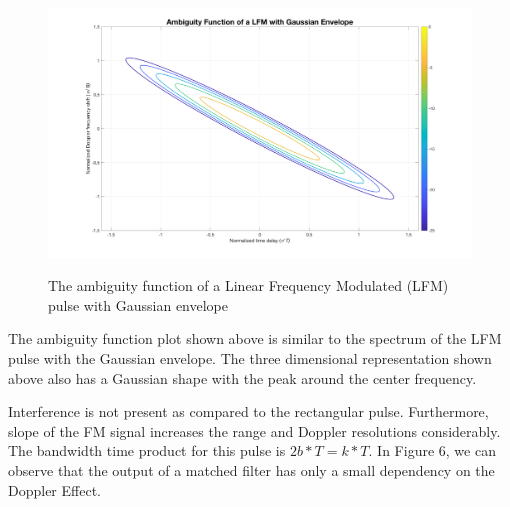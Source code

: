 \begin{figure}[H]
\centering
{\includegraphics[scale=0.18]{usp8_6.png}}
\caption{ The ambiguity function of a Linear Frequency Modulated (LFM) pulse with Gaussian envelope }
\end{figure}

\noindent The ambiguity function plot shown above is similar to the spectrum of the LFM pulse with the Gaussian envelope. The three dimensional representation shown above also has a Gaussian shape with the peak around the center frequency.

\noindent Interference is not present as compared to the rectangular pulse. Furthermore, slope of the FM signal increases the range and Doppler resolutions considerably. The bandwidth time product for this pulse is $2 b*T = k *T.$ In Figure 6, we can observe that the output of a matched filter has only a small dependency on the Doppler Effect. 
